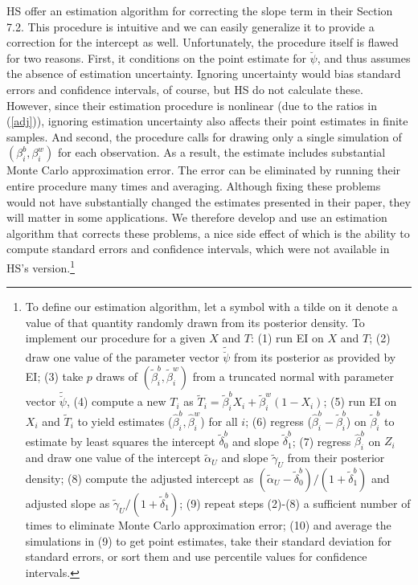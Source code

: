 \documentclass[11pt,titlepage]{article}
\newcommand{\psiu}{\breve{\psi}}
\begin{document}
HS offer an estimation algorithm for correcting the slope term in
their Section 7.2.  This procedure is intuitive and we can easily
generalize it to provide a correction for the intercept as well.
Unfortunately, the procedure itself is flawed for two reasons.  First,
it conditions on the point estimate for $\breve\psi$, and thus assumes
the absence of estimation uncertainty.  Ignoring uncertainty would
bias standard errors and confidence intervals, of course, but HS do
not calculate these.  However, since their estimation procedure is
nonlinear (due to the ratios in (\ref{adj})), ignoring estimation
uncertainty also affects their point estimates in finite samples.  And
second, the procedure calls for drawing only a single simulation of
$(\beta_i^b,\beta_i^w)$ for each observation.  As a result, the
estimate includes substantial Monte Carlo approximation error.  The
error can be eliminated by running their entire procedure many times
and averaging.  Although fixing these problems would not have
substantially changed the estimates presented in their paper, they
will matter in some applications.  We therefore develop and use an
estimation algorithm that corrects these problems, a nice side effect
of which is the ability to compute standard errors and confidence
intervals, which were not available in HS's version.\footnote{To
  define our estimation algorithm, let a symbol with a tilde on it
  denote a value of that quantity randomly drawn from its posterior
  density.  To implement our procedure for a given $X$ and $T$: (1)
  run EI on $X$ and $T$; (2) draw one value of the parameter vector
  $\tilde\psiu$ from its posterior as provided by EI; (3) take $p$
  draws of $(\tilde\beta_i^b,\tilde\beta_i^w)$ from a truncated normal
  with parameter vector $\tilde\psiu$, (4) compute a new $T_i$ as
  $\tilde T_i=\tilde\beta_i^bX_i+\tilde\beta_i^w(1-X_i)$; (5) run EI
  on $X_i$ and $\tilde T_i$ to yield estimates
  ($\hat\beta_i^b,\hat\beta_i^w$) for all $i$; (6) regress
  ($\hat\beta_i^b-\tilde\beta_i^b$) on $\tilde\beta_i^b$ to estimate
  by least squares the intercept $\tilde\delta_0^b$ and slope
  $\tilde\delta_1^b$; (7) regress $\hat\beta_i^b$ on $Z_i$ and draw
  one value of the intercept $\tilde\alpha_U$ and slope
  $\tilde\gamma_U$ from their posterior density; (8) compute the
  adjusted intercept as
  $(\tilde\alpha_U-\tilde\delta_0^b)/(1+\tilde\delta_1^b)$ and
  adjusted slope as $\tilde\gamma_U/(1+\tilde\delta_1^b)$; (9) repeat
  steps (2)-(8) a sufficient number of times to eliminate Monte Carlo
  approximation error; (10) and average the simulations in (9) to get
  point estimates, take their standard deviation for standard errors,
  or sort them and use percentile values for confidence intervals.}
\end{document}
